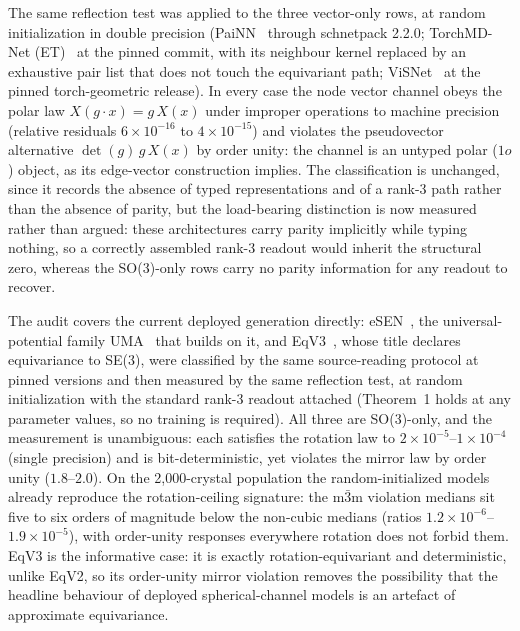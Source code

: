The same reflection test was applied to the three vector-only rows, at random initialization in double precision (PaiNN~\cite{schutt2021painn} through schnetpack 2.2.0; TorchMD-Net (ET)~\cite{tholke2022torchmdnet} at the pinned commit, with its neighbour kernel replaced by an exhaustive pair list that does not touch the equivariant path; ViSNet~\cite{wang2024visnet} at the pinned torch-geometric release). In every case the node vector channel obeys the polar law $X(g\!\cdot\!x) = g\,X(x)$ under improper operations to machine precision (relative residuals $6\times10^{-16}$ to $4\times10^{-15}$) and violates the pseudovector alternative $\det(g)\,g\,X(x)$ by order unity: the channel is an untyped polar ($1o$) object, as its edge-vector construction implies. The classification is unchanged, since it records the absence of typed representations and of a rank-3 path rather than the absence of parity, but the load-bearing distinction is now measured rather than argued: these architectures carry parity implicitly while typing nothing, so a correctly assembled rank-3 readout would inherit the structural zero, whereas the SO(3)-only rows carry no parity information for any readout to recover.

The audit covers the current deployed generation directly: eSEN~\cite{fu2025esen}, the universal-potential family UMA~\cite{wood2025uma} that builds on it, and EqV3~\cite{equiformerv3}, whose title declares equivariance to SE(3), were classified by the same source-reading protocol at pinned versions and then measured by the same reflection test, at random initialization with the standard rank-3 readout attached (Theorem~1 holds at any parameter values, so no training is required). All three are SO(3)-only, and the measurement is unambiguous: each satisfies the rotation law to $2\times10^{-5}$--$1\times10^{-4}$ (single precision) and is bit-deterministic, yet violates the mirror law by order unity ($1.8$--$2.0$). On the 2,000-crystal population the random-initialized models already reproduce the rotation-ceiling signature: the m$\bar 3$m violation medians sit five to six orders of magnitude below the non-cubic medians (ratios $1.2\times10^{-6}$--$1.9\times10^{-5}$), with order-unity responses everywhere rotation does not forbid them. EqV3 is the informative case: it is exactly rotation-equivariant and deterministic, unlike EqV2, so its order-unity mirror violation removes the possibility that the headline behaviour of deployed spherical-channel models is an artefact of approximate equivariance.

